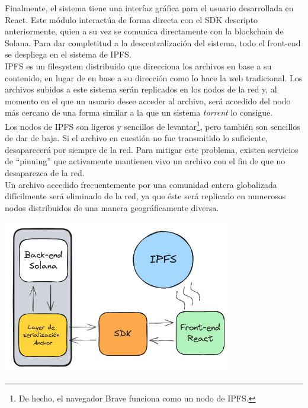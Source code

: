 \begin{multicols}{2}
Finalmente, el sistema tiene una interfaz gráfica para el usuario desarrollada en React\cite{react}. Este módulo interactúa de forma directa con el SDK descripto anteriormente, quien a su vez se comunica directamente con la blockchain de Solana. Para dar completitud a la descentralización del sistema, todo el front-end se despliega en el sistema de IPFS\cite{ipfs}.\\

IPFS es un filesystem distribuido que direcciona los archivos en base a su contenido, en lugar de en base a su dirección como lo hace la web tradicional. Los archivos subidos a este sistema serán replicados en los nodos de la red y, al momento en el que un usuario desee acceder al archivo, será accedido del nodo más cercano de una forma similar a la que un sistema \textit{torrent} lo consigue.\\

Los nodos de IPFS son ligeros y sencillos de levantar\footnote{De hecho, el navegador Brave funciona como un nodo de IPFS\cite{brave-ipfs}.}, pero también son sencillos de dar de baja. Si el archivo en cuestión no fue transmitido lo suficiente, desaparecerá por siempre de la red. Para mitigar este problema, existen servicios de ``pinning'' que activamente mantienen vivo un archivo con el fin de que no desaparezca de la red.\\

Un archivo accedido frecuentemente por una comunidad entera globalizada difícilmente será eliminado de la red, ya que éste será replicado en numerosos nodos distribuidos de una manera geográficamente diversa.\\

\begin{Figure}
\centering
    \includegraphics[width=0.75\textwidth]{img/cubitorium_arch.png}
 \label{fig:arquitectura}
\end{Figure}


\end{multicols}
